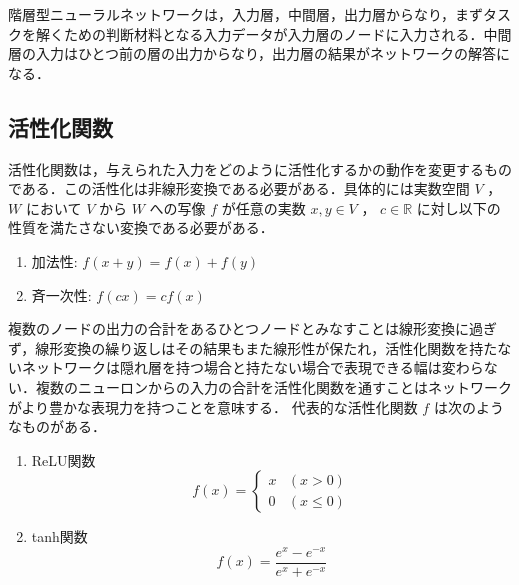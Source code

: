 階層型ニューラルネットワークは，入力層，中間層，出力層からなり，まずタスクを解くための判断材料となる入力データが入力層のノードに入力される．中間層の入力はひとつ前の層の出力からなり，出力層の結果がネットワークの解答になる．\\

\subsection{活性化関数}
活性化関数は，与えられた入力をどのように活性化するかの動作を変更するものである．\cite{活性化関数}この活性化は非線形変換である必要がある．具体的には実数空間 $ V $ ， $ W $ において  $ V $ から $ W $ への写像 $ f $ が任意の実数 $ x, y \in V $ ， $ c \in \mathbb{R} $ に対し以下の性質を満たさない変換である必要がある．

\begin{enumerate}
    \item 加法性: $ f(x + y) = f(x) + f(y) $ 
    \item 斉一次性: $ f(cx) = cf(x) $
\end{enumerate}

複数のノードの出力の合計をあるひとつノードとみなすことは線形変換に過ぎず，線形変換の繰り返しはその結果もまた線形性が保たれ，活性化関数を持たないネットワークは隠れ層を持つ場合と持たない場合で表現できる幅は変わらない．複数のニューロンからの入力の合計を活性化関数を通すことはネットワークがより豊かな表現力を持つことを意味する．
代表的な活性化関数 $ f $ は次のようなものがある．

\begin{enumerate}
    \item ReLU関数
    \begin{equation}
        f(x) = 
        \begin{cases}
        x & (x > 0)\\
        0 & (x \leq 0)
        \end{cases}
    \end{equation}

    \item tanh関数
    \begin{equation}
        f(x) = \frac{e^{x} - e^{-x}}{e^{x} + e^{-x}}
    \end{equation}
\end{enumerate}